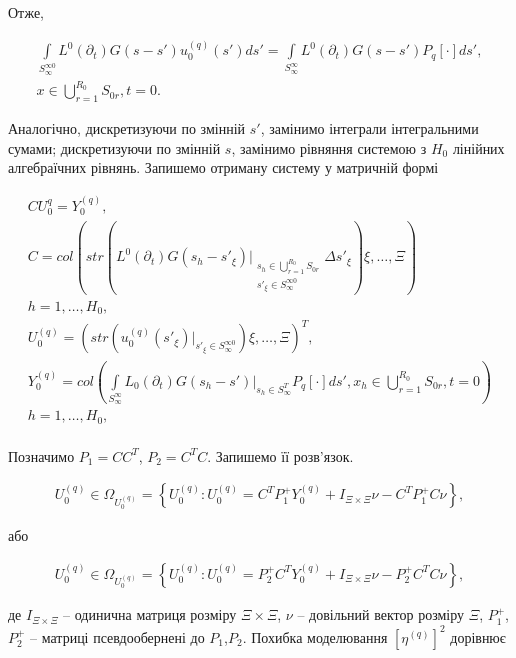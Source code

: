 Отже,

\begin{gather*}
   \int\limits_{S_{\infty}^{\infty 0}} L^{0}(\partial_{t})G(s-s')u_{0}^{(q)}(s')ds' =
   \int\limits_{S_{\infty}^{\infty}}
   L^{0}(\partial_{t})G(s-s')P_{q}\left[ \cdot \right]ds',\\
   x\in\bigcup\limits_{r=1}^{R_{0}} S_{0r},t=0.
\end{gather*}

Аналогічно, дискретизуючи по змінній $s'$, замінимо інтеграли інтегральними сумами;
дискретизуючи по змінній $s$, замінимо  рівняння  системою з $H_{0}$ лінійних алгебраїчних рівнянь.
Запишемо отриману систему у матричній формі

\begin{gather*}
    CU_{0}^{q}=Y_{0}^{(q)},\\
    C=col\left( str\left(L^{0}(\partial_{t})G(s_{h}-s'_{\xi})\bigg|_{\substack{s_{h}\in\bigcup
    \limits_{r=1}^{R_{0}} S_{0r}\\
    s'_{\xi}\in S_{\infty}^{\infty 0}}} \Delta s'_{\xi} \right)\xi,\dots,{\Xi} \right)\\ h=1,\dots,H_{0},\\
    U_{0}^{(q)} = \left( str \left( u_{0}^{(q)}(s'_{\xi})\bigg|_{s'_{\xi}\in S_{\infty}^{\infty 0}} \right) \xi,\dots,{\Xi} \right)^{T},\\
    Y_{0}^{(q)}=col\left(\int\limits_{S_{\infty}^{\infty}} L_{0}(\partial_{t})G(s_{h}-s')\bigg|_{s_{h}\in S_{\infty}
    ^{T}}P_{q}\left[ \cdot \right]ds', x_{h}\in\bigcup\limits_{r=1}^{R_{0}} S_{0r},t=0 \right)\\ h=1,\dots,H_{0},\\
\end{gather*}

Позначимо $P_{1}=CC^{T}$, $P_{2}=C^{T}C$.
Запишемо її розв'язок.

\begin{gather*}
    U_{0}^{(q)}\in \Omega_{U_{0}^{(q)}} = \left\{U_{0}^{(q)} : U_{0}^{(q)} = C^{T}P_{1}^{+}Y_{0}^{(q)}
    + I_{\Xi\times\Xi}\nu -C^{T}P_{1}^{+}C\nu\right\},
\end{gather*}

або

\begin{gather*}
    U_{0}^{(q)}\in \Omega_{U_{0}^{(q)}} = \left\{U_{0}^{(q)} : U_{0}^{(q)} = P_{2}^{+}C^{T}Y_{0}^{(q)}
    + I_{\Xi\times\Xi}\nu -P_{2}^{+}C^{T}C\nu\right\},
\end{gather*}

де $I_{\Xi\times\Xi}$ -- одинична матриця розміру $\Xi\times\Xi$, $\nu$ -- довільний вектор розміру $\Xi$,
$P_{1}^{+}$, $P_{2}^{+}$  -- матриці псевдообернені до $P_{1}$,$P_{2}$.
Похибка моделювання $\left[ \eta^{(q)} \right]^{2}$ дорівнює

